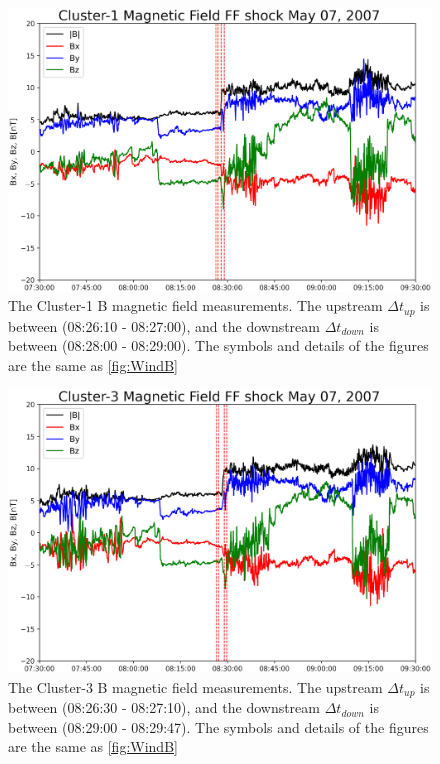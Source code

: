 \documentclass[draft]{agujournal2019}
\begin{document}
\pagebreak

\begin{figure}[!t]
\centering
\includegraphics[width=1.\textwidth]{jgr-2023-ipshocks-f11.eps}
\caption{The Cluster-1 B magnetic field measurements. The upstream $\Delta t_{up}$ is between (08:26:10 - 08:27:00), and the downstream $\Delta t_{down}$ is between (08:28:00 - 08:29:00). The symbols and details of the figures are the same as \ref{fig:WindB}}
\label{fig:cl1b}
\end{figure}

\pagebreak

\begin{figure}[!t]
\centering
\includegraphics[width=1.\textwidth]{jgr-2023-ipshocks-f12.eps}
\caption{The Cluster-3 B magnetic field measurements. The upstream $\Delta t_{up}$ is between (08:26:30 - 08:27:10), and the downstream $\Delta t_{down}$ is between (08:29:00 - 08:29:47). The symbols and details of the figures are the same as \ref{fig:WindB}}
\label{fig:cl3b}
\end{figure}
\end{document}
